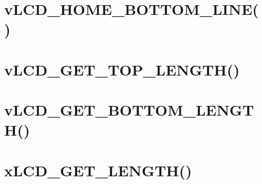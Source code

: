  \hypertarget{_test_plans_bottomhome}{}\section{v\-L\-C\-D\-\_\-\-H\-O\-M\-E\-\_\-\-B\-O\-T\-T\-O\-M\-\_\-\-L\-I\-N\-E()}\label{_test_plans_bottomhome}
 \hypertarget{_flowcharts_gettop}{}\section{v\-L\-C\-D\-\_\-\-G\-E\-T\-\_\-\-T\-O\-P\-\_\-\-L\-E\-N\-G\-T\-H()}\label{_flowcharts_gettop}
 \hypertarget{_flowcharts_getbottom}{}\section{v\-L\-C\-D\-\_\-\-G\-E\-T\-\_\-\-B\-O\-T\-T\-O\-M\-\_\-\-L\-E\-N\-G\-T\-H()}\label{_flowcharts_getbottom}
 \hypertarget{_test_plans_getlength}{}\section{x\-L\-C\-D\-\_\-\-G\-E\-T\-\_\-\-L\-E\-N\-G\-T\-H()}\label{_test_plans_getlength}

